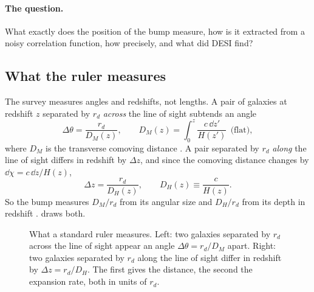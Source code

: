 \paragraph{The question.} What exactly does the position of the bump measure, how is it extracted from a noisy correlation function, how precisely, and what did DESI find?

\subsection{What the ruler measures}

The survey measures angles and redshifts, not lengths. A pair of galaxies at redshift $z$ separated by $r_d$ \emph{across} the line of sight subtends an angle
\[
  \Delta\theta=\frac{r_d}{D_M(z)},\qquad D_M(z)=\int_0^z\frac{c\,\dd z'}{H(z')}\ \ \text{(flat)},
\]
where $D_M$ is the transverse comoving distance \cite[eq.~(16)]{Hogg1999}. A pair separated by $r_d$ \emph{along} the line of sight differs in redshift by $\Delta z$, and since the comoving distance changes by $\dd\chi=c\,\dd z/H(z)$,
\[
  \Delta z=\frac{r_d}{D_H(z)},\qquad D_H(z)\equiv\frac{c}{H(z)} .
\]
So the bump measures $D_M/r_d$ from its angular size and $D_H/r_d$ from its depth in redshift \cite[Sec.~2.1]{DESI2024VI}.  draws both.

\begin{figure}[htbp]
\centering
{}
\caption{What a standard ruler measures. Left: two galaxies separated by $r_d$ across the line of sight appear an angle $\Delta\theta=r_d/D_M$ apart. Right: two galaxies separated by $r_d$ along the line of sight differ in redshift by $\Delta z=r_d/D_H$. The first gives the distance, the second the expansion rate, both in units of $r_d$.}
\label{T2b:fig:bao-geometry}
\end{figure}

